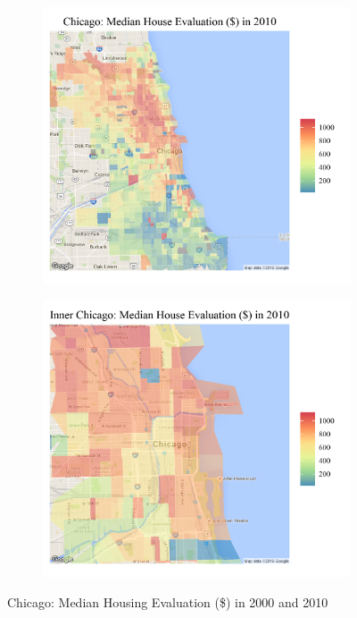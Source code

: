 {\begin{figure}[h!]
\begin{subfigure}{.45\textwidth}
\end{subfigure}
\label{fig:chicago2000}
\begin{subfigure}{.45\textwidth}
  \centering
\includegraphics[scale=.15]{figures/c_2010.png}
\end{subfigure}%
\begin{subfigure}{.45\textwidth}
  \centering
\includegraphics[scale=.15]{figures/c_2010_inner.png}
\end{subfigure}
\caption[Chicago Median Housing Evaluation, 2000-2010]{Chicago: Median Housing Evaluation (\$) in 2000 and 2010}
\label{fig:chicago2000}
\end{figure}

}
